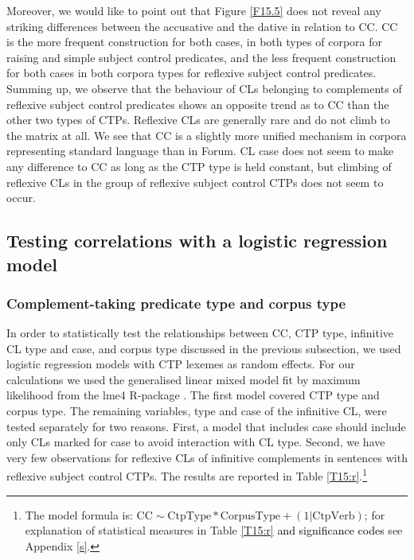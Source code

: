 \noindent Moreover, we would like to point out that Figure \ref{F15.5} does not reveal any striking differences between the accusative and the dative in relation to CC. CC is the more frequent construction for both cases, in both types of corpora for raising and simple subject control predicates, and the less frequent construction for both cases in both corpora types for reflexive subject control predicates. Summing up, we observe that the behaviour of CLs belonging to complements of reflexive subject control predicates shows an opposite trend as to CC than the other two types of CTPs. Reflexive CLs are generally rare and do not climb to the matrix at all. We see that CC is a slightly more unified mechanism in corpora representing standard language than in Forum. CL case does not seem to make any difference to CC as long as the CTP type is held constant, but climbing of reflexive CLs in the group of reflexive subject control CTPs does not seem to occur.

\subsection{Testing correlations with a logistic regression model}
\label{Testing correlations with a logistic regression model}
\subsubsection{Complement-taking predicate type and corpus type}
In order to statistically test the relationships between CC, CTP type, infinitive CL type and case, and corpus type discussed in the previous subsection, we used logistic regression models with CTP lexemes as random effects. For our calculations we used the generalised linear mixed model fit by maximum likelihood from the lme4 R-package \citep*{BKVB15}. The first model covered CTP type and corpus type. The remaining variables, type and case of the infinitive CL, were tested separately for two reasons. First, a model that includes case should include only CLs marked for case to avoid interaction with CL type. Second, we have very few observations for reflexive CLs of infinitive complements in sentences with reflexive subject control CTPs. The results are reported in Table \ref{T15:r}.\footnote{The model formula is: $\text{CC} \sim \text{CtpType} * \text{CorpusType} + (1|\text{CtpVerb})$; for explanation of statistical measures in Table \ref{T15:r} \textcolor{black}{and significance codes} see Appendix \ref{s}.}

